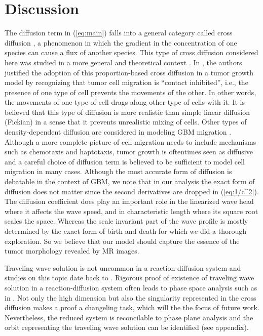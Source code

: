 \documentclass{aims}
\numberwithin{equation}{section}
\begin{document}
\section{Discussion}
The diffusion term in (\ref{eq:main}) falls into a general category
called cross diffusion \cite{Madzvamuse2017}, a phenomenon in which
the gradient in the concentration of one species can cause a flux
of another species. This type of cross diffusion considered here was
studied in a more general and theoretical context \cite{Sherratt2000}.
In \cite{Sherratt2001}, the authors justified the adoption of this
proportion-based cross diffusion in a tumor growth model by recognizing
that tumor cell migration is ``contact inhibited'', i.e., the presence
of one type of cell prevents the movements of the other. In other
words, the movements of one type of cell drags along other type of
cells with it. It is believed that this type of diffusion is more
realistic than simple linear diffusion (Fickian) in a sense that it
prevents unrealistic mixing of cells. Other types of density-dependent
diffusion are considered in modeling GBM migration \cite{Stepien2015a}.
Although a more complete picture of cell migration needs to include
mechanisms such as chemotaxis and haptotaxis, tumor growth is oftentimes
seen as diffusive and a careful choice of diffusion term is believed
to be sufficient to model cell migration in many cases. Although the
most accurate form of diffusion is debatable in the context of GBM,
we note that in our analysis the exact form of diffusion does not
matter since the second derivatives are dropped in (\ref{eq:1/c^2}).
The diffusion coefficient does play an important role in the linearized
wave head where it affects the wave speed, and in characteristic length
where its square root scales the space. Whereas the scale invariant
part of the wave profile is mostly determined by the exact form of
birth and death for which we did a thorough exploration. So we believe
that our model should capture the essence of the tumor morphology
revealed by MR images. 

Traveling wave solution is not uncommon in a reaction-diffusion system
and studies on this topic date back to \cite{FISHER1937}. Rigorous
proof of existence of traveling wave solution in a reaction-diffusion
system often leads to phase space analysis such as in \cite{Dunbar1983}.
Not only the high dimension but also the singularity represented in
the cross diffusion makes a proof a changeling task, which will the
the focus of future work. Nevertheless, the reduced system is reconcilable
to phase plane analysis and the orbit representing the traveling wave
solution can be identified (see appendix). 
\end{document}
